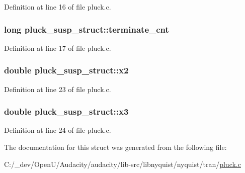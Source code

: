 Definition at line 16 of file pluck.\+c.

\subsubsection[{\texorpdfstring{terminate\+\_\+cnt}{terminate_cnt}}]{\setlength{\rightskip}{0pt plus 5cm}long pluck\+\_\+susp\+\_\+struct\+::terminate\+\_\+cnt}\hypertarget{structpluck__susp__struct_a6bbc830c3e3ab1482f5598c29593953b}{}\label{structpluck__susp__struct_a6bbc830c3e3ab1482f5598c29593953b}


Definition at line 17 of file pluck.\+c.

\subsubsection[{\texorpdfstring{x2}{x2}}]{\setlength{\rightskip}{0pt plus 5cm}double pluck\+\_\+susp\+\_\+struct\+::x2}\hypertarget{structpluck__susp__struct_ada8da23b1a57c20975b6a4ab486ccbfa}{}\label{structpluck__susp__struct_ada8da23b1a57c20975b6a4ab486ccbfa}


Definition at line 23 of file pluck.\+c.

\subsubsection[{\texorpdfstring{x3}{x3}}]{\setlength{\rightskip}{0pt plus 5cm}double pluck\+\_\+susp\+\_\+struct\+::x3}\hypertarget{structpluck__susp__struct_a6c2f8a8b2cae4777e0c39d5f737f8412}{}\label{structpluck__susp__struct_a6c2f8a8b2cae4777e0c39d5f737f8412}


Definition at line 24 of file pluck.\+c.



The documentation for this struct was generated from the following file\+:\begin{DoxyCompactItemize}
\item 
C\+:/\+\_\+dev/\+Open\+U/\+Audacity/audacity/lib-\/src/libnyquist/nyquist/tran/\hyperlink{pluck_8c}{pluck.\+c}\end{DoxyCompactItemize}
